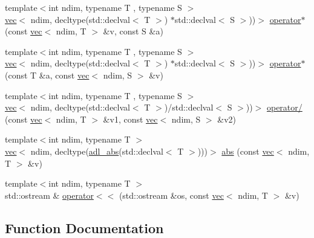 \begin{DoxyCompactItemize}
\item 
{\footnotesize template$<$int ndim, typename T , typename S $>$ }\\\hyperlink{structshark_1_1ndim_1_1vec}{vec}$<$ ndim, decltype(std\+::declval$<$ T $>$) $\ast$std\+::declval$<$ S $>$))$>$ \hyperlink{namespaceshark_1_1ndim_afe2447ddf9376174429a7b4615ab4123}{operator$\ast$} (const \hyperlink{structshark_1_1ndim_1_1vec}{vec}$<$ ndim, T $>$ \&v, const S \&a)
\item 
{\footnotesize template$<$int ndim, typename T , typename S $>$ }\\\hyperlink{structshark_1_1ndim_1_1vec}{vec}$<$ ndim, decltype(std\+::declval$<$ T $>$) $\ast$std\+::declval$<$ S $>$))$>$ \hyperlink{namespaceshark_1_1ndim_aca5a0b87c3d83950719f7ec19025b3b5}{operator$\ast$} (const T \&a, const \hyperlink{structshark_1_1ndim_1_1vec}{vec}$<$ ndim, S $>$ \&v)
\item 
{\footnotesize template$<$int ndim, typename T , typename S $>$ }\\\hyperlink{structshark_1_1ndim_1_1vec}{vec}$<$ ndim, decltype(std\+::declval$<$ T $>$)/std\+::declval$<$ S $>$))$>$ \hyperlink{namespaceshark_1_1ndim_a6dc727bc15068ffca49ca1675cbe6c2b}{operator/} (const \hyperlink{structshark_1_1ndim_1_1vec}{vec}$<$ ndim, T $>$ \&v1, const \hyperlink{structshark_1_1ndim_1_1vec}{vec}$<$ ndim, S $>$ \&v2)
\item 
{\footnotesize template$<$int ndim, typename T $>$ }\\\hyperlink{structshark_1_1ndim_1_1vec}{vec}$<$ ndim, decltype(\hyperlink{namespaceshark_a01c919545e5586af9484f058f38774b6}{adl\+\_\+abs}(std\+::declval$<$ T $>$)))$>$ \hyperlink{namespaceshark_1_1ndim_ac5f55bc3a5d541cd1d6bfd5d462ce365}{abs} (const \hyperlink{structshark_1_1ndim_1_1vec}{vec}$<$ ndim, T $>$ \&v)
\item 
{\footnotesize template$<$int ndim, typename T $>$ }\\std\+::ostream \& \hyperlink{namespaceshark_1_1ndim_ac25a04011fd3ab5350dc899a9359db49}{operator$<$$<$} (std\+::ostream \&os, const \hyperlink{structshark_1_1ndim_1_1vec}{vec}$<$ ndim, T $>$ \&v)
\end{DoxyCompactItemize}


\subsection{Function Documentation}
\hypertarget{namespaceshark_1_1ndim_ac5f55bc3a5d541cd1d6bfd5d462ce365}{}\label{namespaceshark_1_1ndim_ac5f55bc3a5d541cd1d6bfd5d462ce365} 

